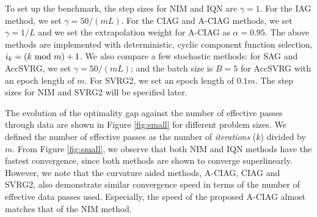 \documentclass[smallextended]{svjour3}       %
\begin{document}
To set up the benchmark, 
the step sizes for {\sf NIM} and {\sf IQN} are  $\gamma = 1$. 
For the {\sf IAG} method, we set $\gamma = 50 / (mL)$. 
For the {\sf CIAG} and {\sf A-CIAG} methods, we set $\gamma = 1 / L$
and we set the extrapolation weight for {\sf A-CIAG} as $\alpha = 0.95$.
The above methods are implemented with
deterministic, cyclic component function selection, \ie $i_k = (k~{\rm mod}~m)+1$. 
We also compare a few stochastic methods: 
for {\sf SAG} and {\sf AccSVRG}, we set $\gamma = 50 / (mL)$; 
and the batch size
is  $B=5$ for {\sf AccSVRG} with an epoch length of $m$. 
For {\sf SVRG2}, we set an epoch length of $0.1m$. 
The step sizes for {\sf NIM} and {\sf SVRG2} will be specified later.
 

The evolution of the optimality gap against the number of effective passes 
through data
are shown in Figure \ref{fig:small}  for different problem sizes. 
We defined the number of effective passes as the number of \emph{iterations}
($k$)
divided by $m$. 
From Figure \ref{fig:small}, 
we observe that both {\sf NIM} and {\sf IQN} 
methods have the fastest convergence, since both methods are 
shown to converge superlinearly. 
However, we note that the curvature aided methods, 
{\sf A-CIAG}, {\sf CIAG} and {\sf SVRG2}, also demonstrate 
similar convergence speed in terms of the number of effective 
data passes used.
Especially, the speed of the proposed {\sf A-CIAG} almost matches that of the {\sf NIM}
method.

\end{document}
